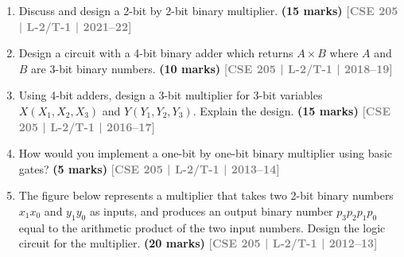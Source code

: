 \documentclass[12pt]{article}
\newcommand{\yr}[1]{\hfill\textcolor{gray}{\small\textbf{[#1]}}}
\newcommand{\mk}[1]{\textcolor{orange!70!black}{\small\textbf{(#1 marks)}}}
\begin{document}
\begin{enumerate}

\item Discuss and design a 2-bit by 2-bit binary multiplier.
\mk{15} \yr{CSE 205 | L-2/T-1 | 2021--22}

\item Design a circuit with a 4-bit binary adder which returns $A \times B$ where $A$ and $B$ are 3-bit binary numbers.
\mk{10} \yr{CSE 205 | L-2/T-1 | 2018--19}

\item Using 4-bit adders, design a 3-bit multiplier for 3-bit variables $X(X_1,X_2,X_3)$ and $Y(Y_1,Y_2,Y_3)$. Explain the design.
\mk{15} \yr{CSE 205 | L-2/T-1 | 2016--17}

\item How would you implement a one-bit by one-bit binary multiplier using basic gates?
\mk{5} \yr{CSE 205 | L-2/T-1 | 2013--14}

\item The figure below represents a multiplier that takes two 2-bit binary numbers $x_1x_0$ and $y_1y_0$ as inputs, and produces an output binary number $p_3p_2p_1p_0$ equal to the arithmetic product of the two input numbers. Design the logic circuit for the multiplier.
\mk{20} \yr{CSE 205 | L-2/T-1 | 2012--13}

\begin{center}
\end{center}

\end{enumerate}
\end{document}
